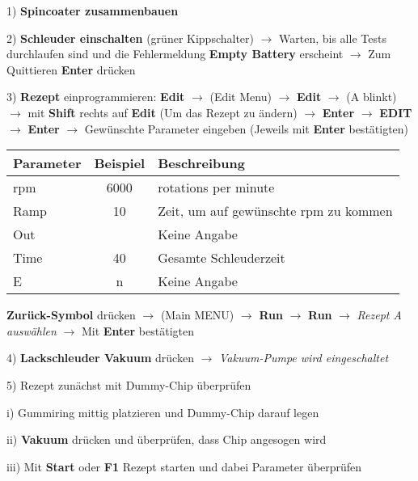 \documentclass[12pt,a4paper]{article}
\begin{document}
\begin{description}
\item 1) \textbf{Spincoater zusammenbauen}

\item 2) \textbf{Schleuder einschalten} (grüner Kippschalter)\newline
$\rightarrow$ Warten, bis alle Tests durchlaufen sind und die Fehlermeldung \textbf{Empty Battery} erscheint\newline
$\rightarrow$ Zum Quittieren \textbf{Enter} drücken

\item 3) \textbf{Rezept} einprogrammieren:\newline
\textbf{Edit} $\rightarrow$ (Edit Menu) $\rightarrow$ \textbf{Edit} $\rightarrow$ (A blinkt) $\rightarrow$ mit \textbf{Shift} rechts auf \textbf{Edit} (Um das Rezept zu ändern) $\rightarrow$ \textbf{Enter} $\rightarrow$ \textbf{EDIT} $\rightarrow$ \textbf{Enter} $\rightarrow$ Gewünschte Parameter eingeben (Jeweils mit \textbf{Enter} bestätigten)\\
\begin{center}
\begin{tabular}{|l | c | l|}\hline
\textbf{Parameter} & \textbf{Beispiel} & \textbf{Beschreibung}\\ \hline
rpm & 6000 & rotations per minute\\
Ramp & 10 & Zeit, um auf gewünschte rpm zu kommen\\
Out & & Keine Angabe\\
Time & 40 & Gesamte Schleuderzeit\\
E & n & Keine Angabe\\ \hline
\end{tabular}
\end{center}

\textbf{Zurück-Symbol} drücken $\rightarrow$ (Main MENU) $\rightarrow$ \textbf{Run} $\rightarrow$ \textbf{Run} $\rightarrow$ \textit{Rezept A auswählen} $\rightarrow$ Mit \textbf{Enter} bestätigten

\item 4) \textbf{Lackschleuder Vakuum} drücken $\rightarrow$ \textit{Vakuum-Pumpe wird eingeschaltet}

\item 5) Rezept zunächst mit Dummy-Chip überprüfen
\begin{description}
\item i) Gummiring mittig platzieren und Dummy-Chip darauf legen 
\item ii) \textbf{Vakuum} drücken und überprüfen, dass Chip angesogen wird
\item iii) Mit \textbf{Start} oder \textbf{F1} Rezept starten und dabei Parameter überprüfen


\end{description}
\end{description}
\end{document}
